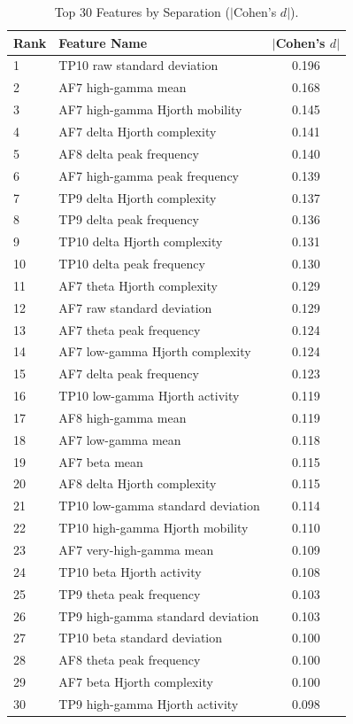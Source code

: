 \begin{table}[H]
\centering
\begin{tabular}{llc}
\hline
Rank & Feature Name & $|$Cohen's $d|$ \\
\hline
1 & TP10 raw standard deviation & 0.196 \\
2 & AF7 high-gamma mean & 0.168 \\
3 & AF7 high-gamma Hjorth mobility & 0.145 \\
4 & AF7 delta Hjorth complexity & 0.141 \\
5 & AF8 delta peak frequency & 0.140 \\
6 & AF7 high-gamma peak frequency & 0.139 \\
7 & TP9 delta Hjorth complexity & 0.137 \\
8 & TP9 delta peak frequency & 0.136 \\
9 & TP10 delta Hjorth complexity & 0.131 \\
10 & TP10 delta peak frequency & 0.130 \\
11 & AF7 theta Hjorth complexity & 0.129 \\
12 & AF7 raw standard deviation & 0.129 \\
13 & AF7 theta peak frequency & 0.124 \\
14 & AF7 low-gamma Hjorth complexity & 0.124 \\
15 & AF7 delta peak frequency & 0.123 \\
16 & TP10 low-gamma Hjorth activity & 0.119 \\
17 & AF8 high-gamma mean & 0.119 \\
18 & AF7 low-gamma mean & 0.118 \\
19 & AF7 beta mean & 0.115 \\
20 & AF8 delta Hjorth complexity & 0.115 \\
21 & TP10 low-gamma standard deviation & 0.114 \\
22 & TP10 high-gamma Hjorth mobility & 0.110 \\
23 & AF7 very-high-gamma mean & 0.109 \\
24 & TP10 beta Hjorth activity & 0.108 \\
25 & TP9 theta peak frequency & 0.103 \\
26 & TP9 high-gamma standard deviation & 0.103 \\
27 & TP10 beta standard deviation & 0.100 \\
28 & AF8 theta peak frequency & 0.100 \\
29 & AF7 beta Hjorth complexity & 0.100 \\
30 & TP9 high-gamma Hjorth activity & 0.098 \\
\hline
\end{tabular}
\caption{Top 30 Features by Separation ($|$Cohen's $d|$).}
\label{tab:cohend_top_features}
\end{table}